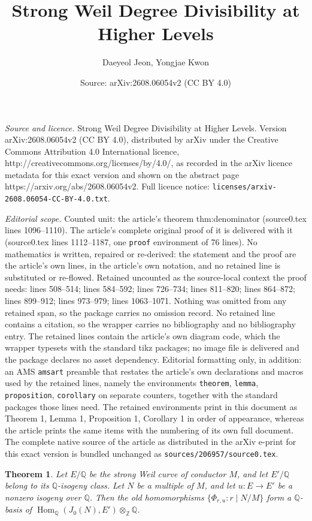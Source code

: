 \documentclass[10pt,a4paper]{amsart}
\title{Strong Weil Degree Divisibility at Higher Levels}
\author{Daeyeol Jeon, Yongjae Kwon}
\date{Source: arXiv:2608.06054v2 (CC BY 4.0)}
\newtheorem{theorem}{Theorem}
\newcommand{\Hom}{\operatorname{Hom}}
\newcommand{\Q}{\mathbb Q}
\newcommand{\Z}{\mathbb Z}
\begin{document}
\maketitle

\noindent\emph{Source and licence.} Strong Weil Degree Divisibility at Higher Levels. Version arXiv:2608.06054v2 (CC BY 4.0), distributed by arXiv under the Creative Commons Attribution 4.0 International licence, http://creativecommons.org/licenses/by/4.0/, as recorded in the arXiv licence metadata for this exact version and shown on the abstract page https://arxiv.org/abs/2608.06054v2. Full licence notice: \texttt{licenses/arxiv-2608.06054-CC-BY-4.0.txt}.\par\smallskip

\noindent\textit{Editorial scope.} Counted unit: the article's theorem thm:denominator (source0.tex lines 1096--1110). The article's complete original proof of it is delivered with it (source0.tex lines 1112--1187, one \texttt{proof} environment of 76 lines). No mathematics is written, repaired or re-derived: the statement and the proof are the article's own lines, in the article's own notation, and no retained line is substituted or re-flowed.  Retained uncounted as the source-local context the proof needs: lines 508--514; lines 584--592; lines 726--734; lines 811--820; lines 864--872; lines 899--912; lines 973--979; lines 1063--1071.  Nothing was omitted from any retained span, so the package carries no omission record.  No retained line contains a citation, so the wrapper carries no bibliography and no bibliography entry.  The retained lines contain the article's own diagram code, which the wrapper typesets with the standard tikz packages; no image file is delivered and the package declares no asset dependency.  Editorial formatting only, in addition: an AMS \texttt{amsart} preamble that restates the article's own declarations and macros used by the retained lines, namely the environments \texttt{theorem}, \texttt{lemma}, \texttt{proposition}, \texttt{corollary} on separate counters, together with the standard packages those lines need.  The retained environments print in this document as Theorem 1, Lemma 1, Proposition 1, Corollary 1 in order of appearance, whereas the article prints the same items with the numbering of its own full document.  The complete native source of the article as distributed in the arXiv e-print for this exact version is bundled unchanged as \texttt{sources/206957/source0.tex}.
\begin{theorem}\label{thm:rational-old-basis}
Let \(E/\Q\) be the strong Weil curve of conductor \(M\), and let \(E'/\Q\)
belong to its \(\Q\)-isogeny class. Let \(N\) be a multiple of \(M\), and let
\(u:E\to E'\) be a nonzero isogeny over \(\Q\). Then
the old homomorphisms \(\{\Phi_{r,u}:r\mid N/M\}\) form a \(\Q\)-basis of
\(\Hom_\Q(J_0(N),E')\otimes_\Z\Q\).
\end{theorem}
\end{document}
